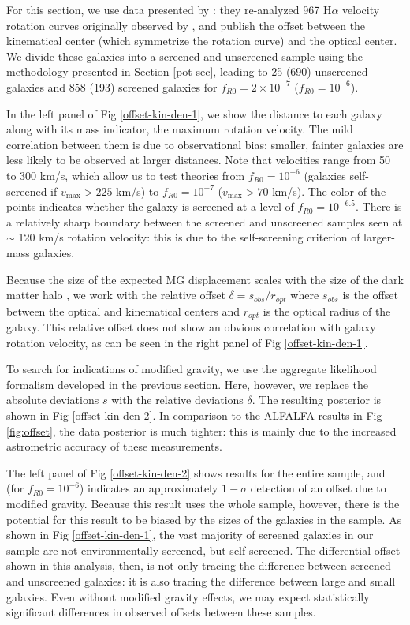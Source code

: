 \documentclass[useAMS,usenatbib,twocolumn]{mn2e}
\newcommand{\ha}{H$\alpha$}
\begin{document}
For this section, we use data presented by \citet{persic1995}:
they re-analyzed 967 \ha{} velocity rotation curves originally 
observed by \citet{mat92}, and publish the offset between the kinematical
center (which symmetrize the rotation curve) and the optical center.  We divide these galaxies into a screened
and unscreened sample using the methodology presented in Section \ref{pot-sec},
leading to 25 (690) unscreened galaxies and 858 (193) screened galaxies
for $f_{R0} = 2 \times 10^{-7}$ ($f_{R0} = 10^{-6}$).

In the left panel of Fig \ref{offset-kin-den-1}, we show the distance to each
galaxy along with its mass indicator, the maximum rotation velocity. The
mild correlation between them is due to observational bias: smaller, fainter
galaxies are less likely to be observed at larger distances.
Note that velocities range from 50 to 300 km/s, which allow us to test
theories from   $f_{R0}=10^{-6}$ (galaxies self-screened if
$v_\mathrm{max} > 225$ km/s) to $f_{R0}=10^{-7}$ ($v_\mathrm{max} > 70$ km/s).
The color of the points indicates whether the galaxy is screened at a level of
$f_{R0} = 10^{-6.5}$.  There is a relatively sharp boundary between the
screened and unscreened samples seen at $\sim$ 120 km/s rotation velocity: this
is due to the self-screening criterion of larger-mass galaxies.

Because the size of the expected MG displacement scales with the size of the
dark matter halo \citep{bhuvjake2011}, we work with the relative offset
$\delta = s_{obs} / r_{opt}$ where $s_{obs}$ is the offset between the optical
and kinematical centers and $r_{opt}$ is the optical radius of the
galaxy.  This relative offset does not show an obvious correlation with
galaxy rotation velocity, as can be seen in the right panel of Fig
\ref{offset-kin-den-1}.

To search for indications of modified gravity, we use the aggregate likelihood
formalism developed in the previous section.  Here, however, we replace the
absolute deviations $s$ with the relative deviations $\delta$.  The resulting
posterior is shown in Fig \ref{offset-kin-den-2}.  In comparison to the
ALFALFA results in Fig \ref{fig:offset}, the data posterior is
much tighter: this is mainly due to the increased astrometric accuracy
of these measurements.

The left panel of Fig \ref{offset-kin-den-2} shows results for the entire sample, and
(for $f_{R0} = 10^{-6}$) indicates an approximately $1-\sigma$ detection
of an offset due to modified gravity.  Because this result uses the whole
sample, however, there is the potential for this result to be biased by the
sizes of the galaxies in the sample.
As shown in Fig \ref{offset-kin-den-1}, the vast majority of screened galaxies
in our sample are not environmentally screened, but self-screened.  The
differential offset shown in this analysis, then, is not only tracing the
difference between screened and unscreened galaxies: it is also tracing
the difference between large and small galaxies.  Even without modified
gravity effects, we may expect statistically significant differences in
observed offsets between these samples.
\end{document}
